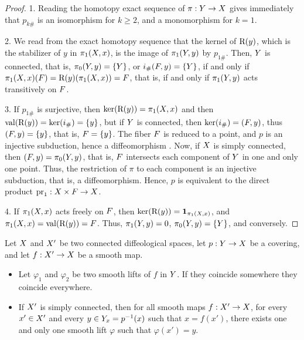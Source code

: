 \begin{proof}
  1. Reading the homotopy exact sequence of $\pi : Y \to X$ gives immediately that $p_{k\#}$ is an isomorphism for $k \geq 2$,
  and a monomorphism for $k=1$.
  
  2. We read from the exact homotopy sequence that the kernel of $\mathrm{R}(y)$,
  which is the stabilizer of $y$ in $\pi_1(X,x)$,
  is the image of $\pi_1(Y,y)$ by $p_{1\#}$.
  Then,
  $Y$ is connected,
  that is,
  $\pi_0(Y,y) = \{ Y \}$, or $i_\#(F,y) = \{ Y \}$,
  if and only if $\pi_1(X,x)(F)= \mathrm{R}(y)(\pi_1(X,x)) = F$,
  that is,
  if and only if $\pi_1(Y,y)$ acts transitively on $F$.
  
  3. If $p_{1\#}$ is surjective,
  then $\mathrm{ker}(\mathrm{R}(y)) = \pi_1(X,x)$ and then $\mathrm{val}(\mathrm{R}(y)) = \mathrm{ker}(i_\#) = \{y\}$,
  but if $Y$ is connected,
  then $\mathrm{ker}(i_\#) = (F,y)$,
  thus $(F,y) = \{y\}$,
  that is,
  $F = \{y\}$.
  The fiber $F$ is reduced to a point,
  and $p$ is an injective subduction,
  hence a diffeomorphism .
  Now,
  if $X$ is simply connected,
  then $(F,y) = \pi_0(Y,y)$,
  that is,
  $F$ intersects each component of $Y$ in one and only one point.
  Thus,
  the restriction of $\pi$ to each component is an injective subduction,
  that is, a diffeomorphism.
  Hence,
  $p$ is equivalent to the direct product $\mathrm{pr}_1 : X \times F \to X$.
  
  4. If $\pi_1(X,x)$ acts freely on $F$,
  then $\mathrm{ker}(\mathrm{R}(y)) = {\bf 1}_{\pi_1(X,x)}$,
  and $\pi_1(X,x) = \mathrm{val}(\mathrm{R}(y)) = F$.
  Thus,
  $\pi_1(Y,y) = 0$, $\pi_0(Y,y) = \{Y\}$,
  and conversely.
\end{proof}

\begin{article}
  \label{Monodromy-theorem}
  Let $X$ and $X'$ be two connected diffeological spaces,
  let $p : Y \to X$ be a covering, and let $f : X' \to X$ be a smooth map.
  \begin{itemize}
    \item[1.] Let $\varphi_1$ and $\varphi_2$ be two smooth lifts of $f$ in $Y$.
    If they coincide somewhere they coincide everywhere.
    \item[2.] If $X'$ is simply connected,
    then for all smooth maps $f : X' \to X$,
    for every $x' \in X'$ and every $y \in Y_x = p^{-1}(x)$ such that $x = f(x')$,
    there exists one and only one smooth lift $\varphi$ such that $\varphi(x') = y$.
  \end{itemize}
\end{article} %

